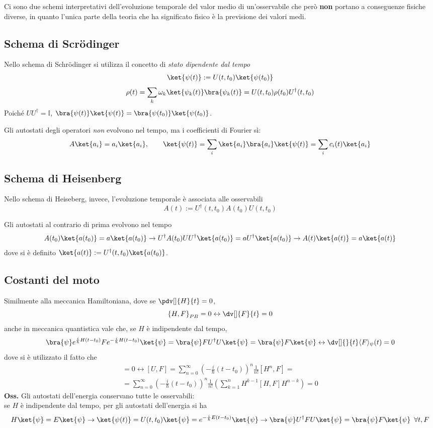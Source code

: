 Ci sono due schemi interpretativi dell'evoluzione temporale del valor medio di un'osservabile che
però \textbf{non} portano a conseguenze fisiche diverse, in quanto l'unica parte della teoria che ha
significato fisico è la previsione dei valori medi.
\subsection{Schema di Scrödinger}
Nello schema di Schrödinger si utilizza il concetto di \textit{stato dipendente dal tempo}
\begin{gather*}
\ket{\psi(t)}:=U(t,t_0)\ket{\psi(t_0)}\\
\rho(t)=\sum_{k}^{}\omega_k\ket{\psi_k(t)}\bra{\psi_k(t)} = U(t,t_0)\rho(t_0)U^{\dagger}(t,t_0)
\end{gather*}
Poiché $UU^{\dagger}=\mathbb{I}$, $\bra{\psi(t)}\ket{\psi(t)} = \bra{\psi(t_0)}\ket{\psi(t_0)}$.

Gli autostati degli operatori \textit{non} evolvono nel tempo, ma i coefficienti di Fourier sì:
$$A\ket{a_i}=a_i\ket{a_i},\quad\quad\ket{\psi(t)} = \sum_{i}\ket{a_i}\bra{a_i}\ket{\psi(t)} =
\sum_{i}c_i(t)\ket{a_i}$$

\subsection{Schema di Heisenberg}
Nello schema di Heiseberg, invece, l'evoluzione temporale è associata alle osservabili
$$A(t):=U^\dagger(t,t_0) A(t_0)U(t,t_0)$$

Gli autostati al contrario di prima evolvono nel tempo
$$A(t_0)\ket{a(t_0)}=a\ket{a(t_0)}\rightarrow
U^\dagger A(t_0)UU^\dagger\ket{a(t_0)}=a U^\dagger\ket{a(t_0)}\rightarrow
A(t)\ket{a(t)} = a\ket{a(t)}$$
dove si è definito $\ket{a(t)}:=U^\dagger(t,t_0)\ket{a(t_0)}$.
\subsection{Costanti del moto}
Similmente alla meccanica Hamiltoniana, dove se $\pdv[]{H}{t}=0$,
$$\left\{H,F\right\}_{PB}=0\leftrightarrow\dv[]{F}{t}=0$$
anche in meccanica quantistica vale che, se $H$ è indipendente dal tempo,
$$\bra{\psi}e^{\frac{i}{\hbar}H(t-t_0)} Fe^{-\frac{i}{\hbar}H(t-t_0)}\ket{\psi} = 
\bra{\psi}FU^\dagger U\ket{\psi} = \bra{\psi}F\ket{\psi} \leftrightarrow
\dv[]{}{t}\langle F\rangle_\psi(t)=0
$$
dove si è utilizzato il fatto che 
\begin{gather*}
[H,F]=0\leftrightarrow[U,F]=\sum_{n=0}^{\infty}\left(-\frac{i}{\hbar}(t-t_0)\right)^n\frac{1}{n!}[H^n,F]=\\
=\sum_{n=0}^{\infty}\left(-\frac{i}{\hbar}(t-t_0)\right)^n\frac{1}{n!}
\left(\sum_{k=1}^{n}H^{k-1}[H,F]H^{n-k}\right)=0
\end{gather*}
\textbf{Oss.} Gli autostati dell'energia conservano tutte le osservabili:\\
se $H$ è indipendente dal tempo, per gli autostati dell'energia si ha
$$H\ket{\psi}=E\ket{\psi} \rightarrow \ket{\psi(t)}=U(t,t_0)\ket{\psi} = e^{-\frac{i}{\hbar}E(t-t_0)}
\ket{\psi} \rightarrow \bra{\psi}U^\dagger FU\ket{\psi} = \bra{\psi}F\ket{\psi}\mkern9mu\forall t,F$$
